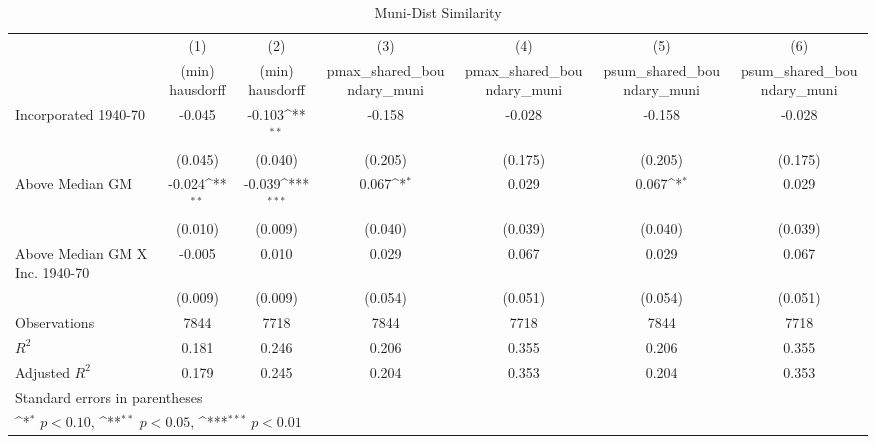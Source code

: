 \begin{table}[htbp]\centering
\def\sym#1{\ifmmode^{#1}\else\(^{#1}\)\fi}
\caption{Muni-Dist Similarity}
\begin{tabular}{l*{6}{c}}
\hline\hline
                    &\multicolumn{1}{c}{(1)}&\multicolumn{1}{c}{(2)}&\multicolumn{1}{c}{(3)}&\multicolumn{1}{c}{(4)}&\multicolumn{1}{c}{(5)}&\multicolumn{1}{c}{(6)}\\
                    &\multicolumn{1}{c}{(min) hausdorff}&\multicolumn{1}{c}{(min) hausdorff}&\multicolumn{1}{c}{pmax\_shared\_boundary\_muni}&\multicolumn{1}{c}{pmax\_shared\_boundary\_muni}&\multicolumn{1}{c}{psum\_shared\_boundary\_muni}&\multicolumn{1}{c}{psum\_shared\_boundary\_muni}\\
\hline
Incorporated 1940-70&      -0.045         &      -0.103\sym{**} &      -0.158         &      -0.028         &      -0.158         &      -0.028         \\
                    &     (0.045)         &     (0.040)         &     (0.205)         &     (0.175)         &     (0.205)         &     (0.175)         \\
[1em]
Above Median GM     &      -0.024\sym{**} &      -0.039\sym{***}&       0.067\sym{*}  &       0.029         &       0.067\sym{*}  &       0.029         \\
                    &     (0.010)         &     (0.009)         &     (0.040)         &     (0.039)         &     (0.040)         &     (0.039)         \\
[1em]
Above Median GM X Inc. 1940-70&      -0.005         &       0.010         &       0.029         &       0.067         &       0.029         &       0.067         \\
                    &     (0.009)         &     (0.009)         &     (0.054)         &     (0.051)         &     (0.054)         &     (0.051)         \\
\hline
Observations        &        7844         &        7718         &        7844         &        7718         &        7844         &        7718         \\
\(R^{2}\)           &       0.181         &       0.246         &       0.206         &       0.355         &       0.206         &       0.355         \\
Adjusted \(R^{2}\)  &       0.179         &       0.245         &       0.204         &       0.353         &       0.204         &       0.353         \\
\hline\hline
\multicolumn{7}{l}{\footnotesize Standard errors in parentheses}\\
\multicolumn{7}{l}{\footnotesize \sym{*} \(p<0.10\), \sym{**} \(p<0.05\), \sym{***} \(p<0.01\)}\\
\end{tabular}
\end{table}
